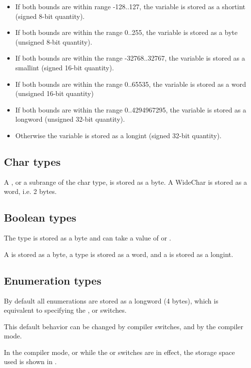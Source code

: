\begin{itemize}
\item If both bounds are within range -128..127, the variable
is stored as a shortint (signed 8-bit quantity).
\item If both bounds are within the range 0..255, the variable
is stored as a byte (unsigned 8-bit quantity).
\item If both bounds are within the range -32768..32767, the variable
is stored as a smallint (signed 16-bit quantity).
\item If both bounds are within the range 0..65535, the variable
is stored as a word (unsigned 16-bit quantity)
\item If both bounds are within the range 0..4294967295, the
variable is stored as a longword (unsigned 32-bit quantity).
\item Otherwise the variable is stored as a longint (signed
32-bit quantity).
\end{itemize}

\subsection{Char types}

A , or a subrange of the char type, is stored
as a byte. A WideChar is stored as a word, i.e. 2 bytes.

\subsection{Boolean types}
The  type is stored as a byte and can take
a value of  or .

A  is stored as a byte, a 
type is stored as a word, and a  is stored
as a longint.

\subsection{Enumeration types}

By default all enumerations are stored as a
longword (4 bytes), which is equivalent to specifying
the ,  or
 switches.

This default behavior can be changed by compiler switches,
and by the compiler mode.

In the  compiler mode, or while the  or
 switches are in effect, the storage
space used is shown in .

